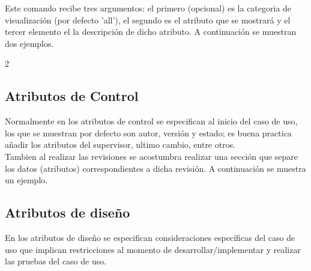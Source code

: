 \clearpage
{} Este comando recibe tres argumentos: el primero (opcional) es la categoria de visualización (por defecto 'all'), el segundo es el atributo que se mostrará y el tercer elemento el la descripción de dicho atributo. A continuación se muestran dos ejemplos.

    \begin{multicols}{2}
    \begin{code}
    \end{code}
    \columnbreak
    \begin{code}
    \end{code}
    \end{multicols}

\subsection{Atributos de Control}

Normalmente en los atributos de control se especifican al inicio del caso de uso, los que se muestran por defecto son autor, versión y estado; es buena practica añadir los atributos del supervisor, ultimo cambio, entre otros.\\
    
\noindent Tambien al realizar las revisiones se acostumbra realizar una sección que separe los datos (atributos) correspondientes a dicha revisión. A continuación se muestra un ejemplo.

    \begin{code}

    \end{code}

\subsection{Atributos de diseño}

En los atributos de diseño se especifican consideraciones específicas del caso de uso que implican restricciones al momento de desarrollar/implementar y realizar las pruebas del caso de uso.

